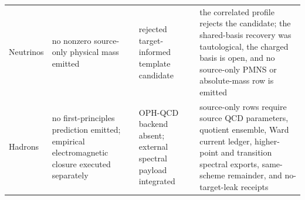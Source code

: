\documentclass[11pt]{article}
\begin{document}
\begin{table}[h]
\begin{tabular}{@{}>{\raggedright\arraybackslash}p{}>{\raggedright\arraybackslash}p{}>{\raggedright\arraybackslash}p{}>{\raggedright\arraybackslash}p{}@{}}
Neutrinos & no nonzero source-only physical mass emitted & rejected target-informed template candidate & the correlated profile rejects the candidate; the shared-basis recovery was tautological, the charged basis is open, and no source-only PMNS or absolute-mass row is emitted~\cite{nufit61} \\
Hadrons & no first-principles prediction emitted; empirical electromagnetic closure executed separately & OPH-QCD backend absent; external spectral payload integrated & source-only rows require source QCD parameters, quotient ensemble, Ward current ledger, higher-point and transition spectral exports, same-scheme remainder, and no-target-leak receipts \\
\bottomrule
\end{tabular}
\end{table}
\end{document}
